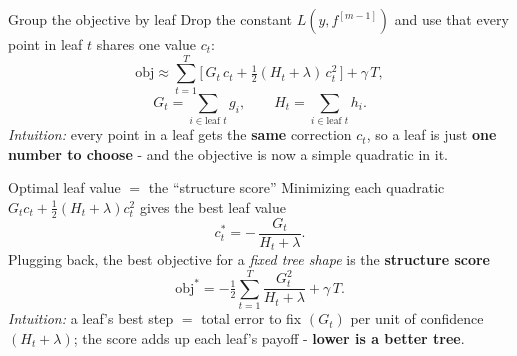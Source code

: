 \documentclass[aspectratio=169]{beamer}
\begin{document}
\begin{frame}{Group the objective by leaf}
  Drop the constant $L(y,f^{[m-1]})$ and use that every point in leaf $t$ shares one value $c_t$:
  \[
    \mathrm{obj} \approx \sum_{t=1}^{T}\Big[\, G_t\, c_t + \tfrac12 (H_t + \lambda)\, c_t^2 \,\Big] + \gamma\,T,
  \]
  \[
    G_t = \!\!\sum_{i \in \text{leaf } t}\!\! g_i, \qquad H_t = \!\!\sum_{i \in \text{leaf } t}\!\! h_i .
  \]
  \vfill
  \emph{Intuition:} every point in a leaf gets the \textbf{same} correction $c_t$, so a leaf is
  just \textbf{one number to choose} - and the objective is now a simple quadratic in it.
\end{frame}

\begin{frame}{Optimal leaf value $=$ the ``structure score''}
  Minimizing each quadratic $G_t c_t + \tfrac12(H_t+\lambda)c_t^2$ gives the best leaf value
  \[
    c_t^{*} = -\,\frac{G_t}{H_t + \lambda}.
  \]
  Plugging back, the best objective for a \emph{fixed tree shape} is the \textbf{structure score}
  \[
    \mathrm{obj}^{*} = -\tfrac12 \sum_{t=1}^{T} \frac{G_t^2}{H_t + \lambda} + \gamma\,T .
  \]
  {\footnotesize \emph{Intuition:} a leaf's best step $=$ total error to fix $(G_t)$ per unit of
  confidence $(H_t{+}\lambda)$; the score adds up each leaf's payoff - \textbf{lower is a better tree}.}
  \vskip 3pt
\end{frame}
\end{document}

